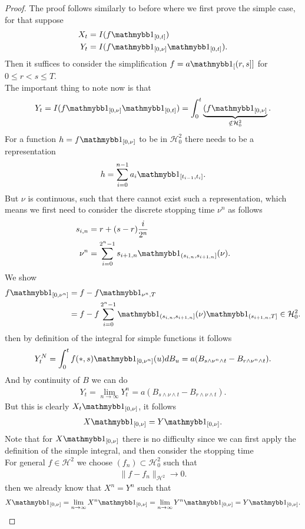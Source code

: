 \begin{proof}
 The proof follows similarly to before where we first prove the simple case, for that suppose
 \begin{align*}
   X_t &= I(f\cha_{[0,t]})\\
   Y_t &= I(f\cha_{[0,\nu ]}\cha_{[0,t]})
 .\end{align*}
 Then it suffices to consider the simplification $f = a\cha_[(r,s]] $ for $0\le r < s \le T$.\\
 The important thing to note now is that 
 \begin{align*}
   Y_t =  I(f\cha_{[0,\nu ]}\cha_{[0,t]}) = \int_0^{t}\underbrace{(f \cha_{[0,\nu ]}}_{\notin \mathcal{H}_0^2}
 .\end{align*}
 For a function $h = f\cha_{[0,\nu ]}$ to be in $\mathcal{H}_0^2$ there needs to be a representation 
 \begin{align*}
   h =  \sum_{i=0}^{n-1} a_i \cha_{[t_{i-1},t_{i}]}  
 .\end{align*}
 But $\nu$ is continuous, such that there cannot exist such a representation, which means we first 
 need to consider the discrete stopping time $\nu^n$ as follows 
 \begin{align*}
   s_{i,n} &= r+(s-r)\frac{i}{2^{n} }\\
   \nu ^{n} &= \sum_{i=0}^{2^{n} - 1 } s_{i+1,n}\cha_{(s_{i,n},s_{i+1,n}]}(\nu )
 .\end{align*}
 We show 
 \begin{align*}
   f \cha_{[0,\nu ^{n} ]} &=  f- f \cha_{\nu ^{n},T }\\
                          &= f - f \sum_{i=0}^{2^{n} - 1 } \cha_{(s_{i,n},s_{i+1,n}]}(\nu)\cha_{(s_{i+1,n},T]} \in  \mathcal{H}_0^{2} 
 .\end{align*}
 then by definition of the integral for simple functions it follows
 \begin{align*}
   Y_t^N = \int_0^{t} f(*,s) \cha_{[0,\nu^n]}(u) dB_u = a(B_{s \land \nu ^{n} \land t } - B_{r \land \nu ^{n} \land t })
 .\end{align*}
 And by continuity of $B$ we can do
 \begin{align*}
   Y_t  = \lim_{n\to \infty}Y_t^n = a(B_{s \land \nu \land t } - B_{r \land \nu  \land t })
 .\end{align*}
 But this is clearly $X_t\cha_{[0,\nu ]}$, it follows
 \begin{align*}
   X\cha_{[0,\nu ]} =  Y\cha_{[0,\nu ]}
 .\end{align*}
 Note that for $X\cha_{[0,\nu ]}$  there is no difficulty since we can first apply the definition of the simple integral,
 and then consider the stopping time\\[1ex]
 For general $f \in  \mathcal{H}^2$ we choose $(f_n) \subset  \mathcal{H}_0^{2} $ such that 
 \begin{align*}
   \|f -f_n\|_{\mathcal{H}^2} \to 0
 .\end{align*}
 then we already know that $X^n = Y^n$ such that 
 \begin{align*}
   X \cha_{[0,\nu ]} = \lim_{n\to \infty}X^n\cha_{[0,\nu ]} = \lim_{n \to \infty} Y^n\cha_{[0,\nu ]} = Y \cha_{[0,\nu ]}
 .\end{align*}
\end{proof}
